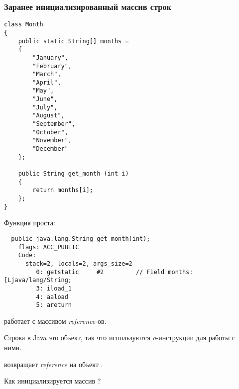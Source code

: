 \subsubsection{Заранее инициализированный массив строк}
\label{Java_2D_array_month}

\begin{lstlisting}[style=customjava]
class Month
{
	public static String[] months = 
	{
		"January", 
		"February", 
		"March", 
		"April",
		"May",
		"June",
		"July",
		"August",
		"September",
		"October",
		"November",
		"December"
	};

	public String get_month (int i)
	{
		return months[i];
	};
} 
\end{lstlisting}

Функция  проста:

\begin{lstlisting}
  public java.lang.String get_month(int);
    flags: ACC_PUBLIC
    Code:
      stack=2, locals=2, args_size=2
         0: getstatic     #2         // Field months:[Ljava/lang/String;
         3: iload_1       
         4: aaload        
         5: areturn       
\end{lstlisting}


 работает с массивом \emph{reference}-ов.

Строка в Java это объект, так что используются \emph{a}-инструкции для работы с ними.

 возвращает \emph{reference} на объект .


Как инициализируется массив ?

